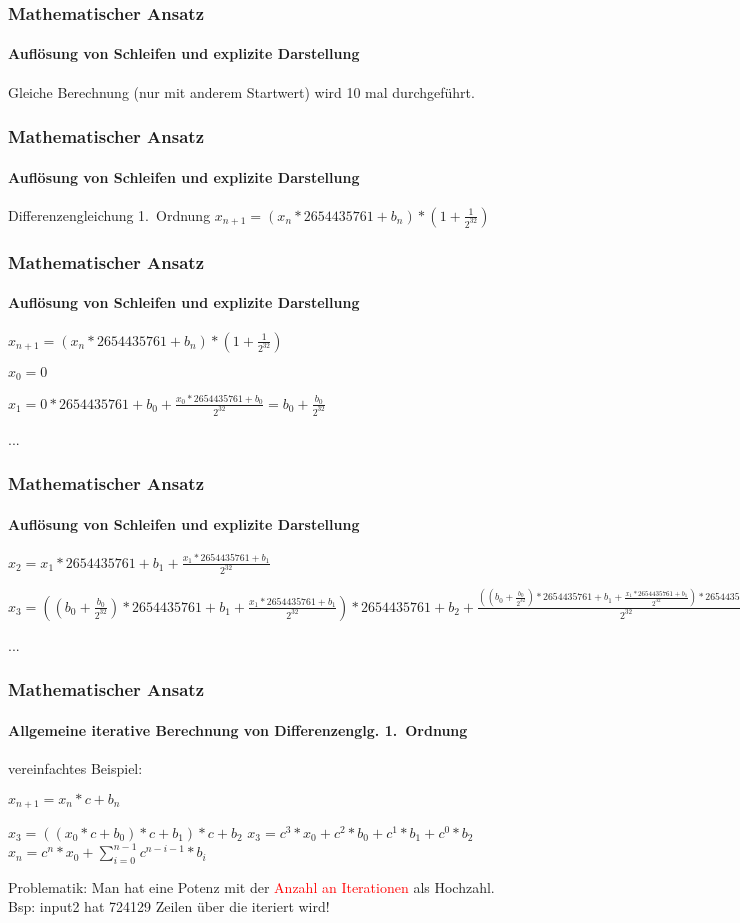 \documentclass{beamer}
\newcommand{\fail}[1]{\textcolor{red}{#1}}
\begin{document}
\begin{frame}
  	\frametitle{Mathematischer Ansatz}
  	\framesubtitle{Aufl\"osung von Schleifen und explizite Darstellung}
  	\duploop
		

		Gleiche Berechnung (nur mit anderem Startwert) wird 10 mal durchgef\"uhrt.
\end{frame}

\begin{frame}
  	\frametitle{Mathematischer Ansatz}
  	\framesubtitle{Aufl\"osung von Schleifen und explizite Darstellung}
  	\diffgleichung
	
	\begin{block}{Differenzengleichung 1.~Ordnung}	
	$x_{n+1} = (x_{n} * 2654435761 + b_{n}) * (1 + \frac{1}{2^{32}})$
	\end{block}

	
\end{frame}

\begin{frame}
  	\frametitle{Mathematischer Ansatz}
  	\framesubtitle{Aufl\"osung von Schleifen und explizite Darstellung}
  	\diffgleichung
		
		$x_{n+1} = (x_{n} * 2654435761 + b_{n}) * (1 + \frac{1}{2^{32}})$

$x_{0} = 0$

$x_{1} = 0 * 2654435761 + b_{0} + \frac{x_{0}*2654435761 + b_{0}}{2 ^{32}} = b_{0} +  \frac{b_{0}}{2 ^{32}}  $

...

\end{frame}

\begin{frame}
  	\frametitle{Mathematischer Ansatz}
  	\framesubtitle{Aufl\"osung von Schleifen und explizite Darstellung}

$x_{2} = x_{1} * 2654435761 + b_{1} + \frac{x_{1}*2654435761 + b_{1}}{2^{32}}$

$x_{3} = ((b_{0} +  \frac{b_{0}}{2 ^{32}}) * 2654435761 + b_{1} + \frac{x_{1}*2654435761 + b_{1}}{2^{32}}) * 2654435761 + b_{2} + \frac{((b_{0} +  \frac{b_{0}}{2 ^{32}}) * 2654435761 + b_{1} + \frac{x_{1}*2654435761 + b_{1}}{2^{32}})*2654435761 + b_{2}}{2^{32}}$

...

\end{frame}

\begin{frame}
  	\frametitle{Mathematischer Ansatz}
  	\framesubtitle{Allgemeine iterative Berechnung von Differenzenglg. 1.~Ordnung}
	\begin{block}{vereinfachtes Beispiel:}
	
	
	$x_{n+1} = x_{n}* c + b_{n}$

	$x_{3} = ((x_{0} * c  + b_{0}) * c + b_{1}) * c + b_{2}$
	$x_{3} = c^3 * x_{0} + c^2 * b_{0} + c^1 * b_{1} + c^0 * b_{2}$
	$x_{n} = c^n * x_{0} + \sum_{i=0}^{n-1} c^{n-i-1} * b_{i}$
	\end{block}
	\begin{block}{Problematik:}
Man hat eine Potenz mit der \fail{Anzahl an Iterationen} als Hochzahl.\\
Bsp: input2 hat 724129 Zeilen \"uber die iteriert wird!
	\end{block}

\end{frame}
\end{document}
